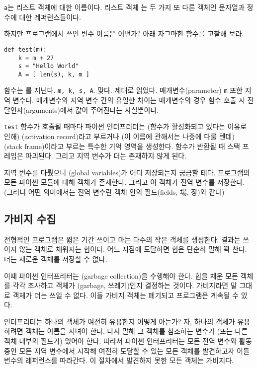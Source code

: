 \documentclass[a4paper]{oblivoir}
\begin{document}
 \texttt{a}는 리스트 객체에 대한 이름이다. 리스트 객체 는 두 가지 또 다른 객체인 문자열과 정수에 대한 레퍼런스들이다. 

하지만 프로그램에서 쓰인 변수 이름은 어떤가? 아래 자그마한 함수를 고찰해 보라.

\begin{verbatim}
def test(m):
    k = m + 27
    s = "Hello World"
    A = [ len(s), k, m ]
\end{verbatim}

 함수는 를 지닌다. \texttt{m, k, s, A}. 맞다. 제대로 읽었다. 매개변수(parameter) \texttt{m} 또한 지역 변수다. 매개변수와 지역 변수 간의 유일한 차이는 매개변수의 경우 함수 호출 시 전달인자(arguments)에서 값이 주어진다는 사실뿐이다.

\texttt{test} 함수가 호출될 때마다 파이썬 인터프리터는 (함수가 활성화되고 있다는 이유로 인해) (activation record)라고 부르거나 (이 이름에 관해서는 나중에 다룰 텐데) (stack frame)이라고 부르는 특수한 기억 영역을 생성한다. 함수가 반환될 때 스택 프레임은 파괴된다. 그리고  지역 변수가 더는 존재하지 않게 된다.

지역 변수를 다뤘으니 (global variables)가 어디 저장되는지 궁금할 테다. 프로그램의 모든 파이썬 모듈에 대해 객체가 존재한다. 그리고 이 객체가 전역 변수를 저장한다. (그러니 어떤 의미에서는 전역 변수란 객체 안의 필드(fields, 場, 장)와 같다)

\subsection*{가비지 수집}

전형적인 프로그램은 짧은 기간 쓰이고 마는 다수의 작은 객체를 생성한다. 결과는 쓰이지 않는 객체로 채워지는 힙이다. 어느 지점에 도달하면 힙은 단순히 말해 꽉 찬다. 더는 새로운 객체를 저장할 수 없다.

이때 파이썬 인터프리터는 (garbage collection)을 수행해야 한다.  힙을 채운 모든 객체를 각각 조사하고 객체가 (garbage, 쓰레기)인지 결정하는 것이다. 가비지라면 말 그대로 객체가 더는 쓰일 수 없다. 이들 가비지 객체는 폐기되고 프로그램은 계속될 수 있다.

인터프리터는 하나의 객체가 여전히 유용한지 어떻게 아는가? 자, 하나의 객체가 유용하려면 객체는 이름을 지녀야 한다. 다시 말해 그 객체를 참조하는 변수가 (또는 다른 객체 내부의 필드가) 있어야 한다. 따라서 파이썬 인터프리터는 모든 전역 변수와 활동 중인 모든 지역 변수에서 시작해 여전히 도달할 수 있는 모든 객체를 발견하고자 이들 변수의 레퍼런스를 따라간다. 이 절차에서 발견하지 못한 모든 객체는 가비지다.
\end{document}
